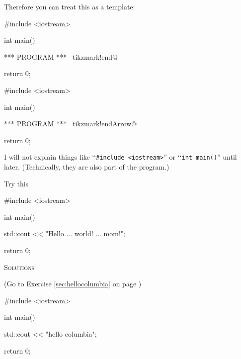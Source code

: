 Therefore you can treat this as a template:


\begin{console}[commandchars=\~\!\@]
#include <iostream>

int main()
{

    *** PROGRAM *** ~tikzmark!end@

    return 0;
}
\end{console}
\begin{console}[commandchars=\~\!\@]
#include <iostream>

int main()
{

    *** PROGRAM *** ~tikzmark!endArrow@
    
    return 0;
}
\end{console}

I will not explain things like 
\lq\lq \verb!#include <iostream>!'' or 
\lq\lq\verb!int main()!'' until later. 
(Technically, they are also part of  the program.)



Try this
\begin{console}
#include <iostream>

int main()
{
    std::cout << "Hello ... world! ... mom!\n";

    return 0;
}
\end{console}

%






\newpage\textsc{Solutions}

\begin{soln}\label{sec:hellocolumbia_soln}
(Go to Exercise \ref{sec:hellocolumbia} on page \pageref{sec:hellocolumbia})
\begin{console}
#include <iostream>

int main()
{
    std::cout << "hello columbia\n";

    return 0;
}
\end{console}
\end{soln}


